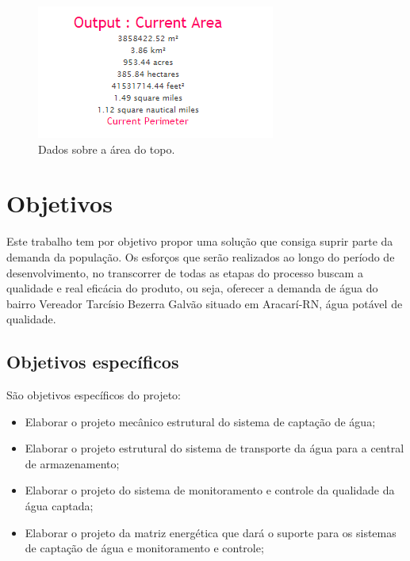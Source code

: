     \begin{figure}[h]
    \begin{center}
      \includegraphics[scale=0.8]{editaveis/figuras/mapa_area_2_dados}
      \caption[Dados sobre a área do topo]{Dados sobre a área do topo. \footnotemark}
      \label{mapa_area_2_dados}
    \end{center}
    \end{figure}
    \FloatBarrier
    
\pagebreak
\section{Objetivos}

Este trabalho tem por objetivo propor uma solução que consiga suprir parte da demanda da população. Os esforços que serão
realizados ao longo do período de desenvolvimento, no transcorrer de todas as etapas do processo buscam a qualidade e real
eficácia do produto, ou seja, oferecer a demanda de água do bairro Vereador Tarcísio Bezerra Galvão situado em Aracarí-RN, 
água potável de qualidade.

 \subsection{Objetivos específicos}
 
 São objetivos específicos do projeto:
 \begin{itemize}
  \item Elaborar o projeto mecânico estrutural do sistema de captação de água;
  \item Elaborar o projeto estrutural do sistema de transporte da água para a central de armazenamento;
  \item Elaborar o projeto do sistema de monitoramento e controle da qualidade da água captada;
  \item Elaborar o projeto da matriz energética que dará o suporte para os sistemas de captação de água e monitoramento e controle;
 \end{itemize}

